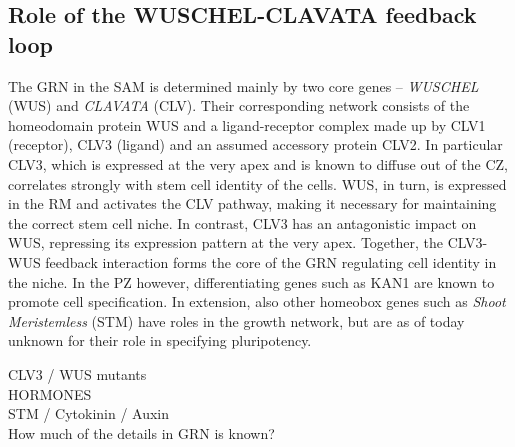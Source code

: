 \subsection{Role of the WUSCHEL-CLAVATA feedback loop} %
The GRN in the SAM is determined mainly by two core genes -- \textit{WUSCHEL} (WUS) and
\textit{CLAVATA} (CLV). Their corresponding network consists of the homeodomain protein
WUS and a ligand-receptor complex made up by CLV1 (receptor), CLV3 (ligand) and
an assumed accessory protein CLV2. In particular CLV3, which is expressed at
the very apex and is known to diffuse out of the CZ, correlates strongly with
stem cell identity of the cells. \FIG WUS, in turn, is expressed in the RM and 
activates the CLV pathway, making it necessary for maintaining the correct stem
cell niche. In contrast, CLV3 has an antagonistic impact on WUS, repressing its
expression pattern at the very apex. Together, the CLV3-WUS feedback interaction
forms the core of the GRN regulating cell identity in the niche. In the
PZ however, differentiating genes such as KAN1 \CITE are known to promote cell
specification. In extension, also other homeobox genes such as \textit{Shoot
  Meristemless} (STM) have roles in the growth network, but are as of today
unknown for their role in specifying pluripotency. \CITE %




\REWRITE
CLV3 / WUS mutants \\

HORMONES \\
STM / Cytokinin / Auxin \\

How much of the details in GRN is known? \\



